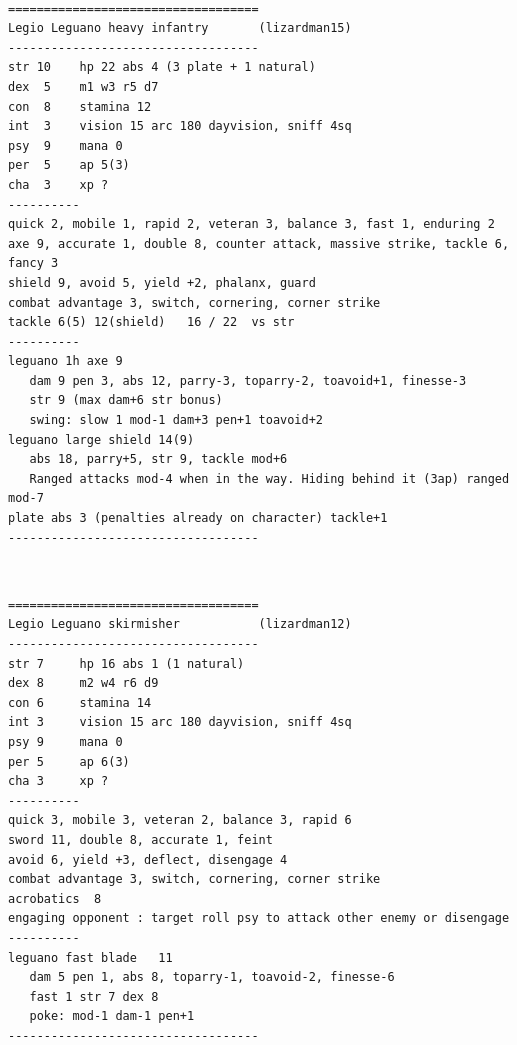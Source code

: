 \


\goodbreak
\begin{samepage}
\small \begin{verbatim}
===================================
Legio Leguano heavy infantry       (lizardman15)
-----------------------------------
str 10    hp 22 abs 4 (3 plate + 1 natural)
dex  5    m1 w3 r5 d7
con  8    stamina 12
int  3    vision 15 arc 180 dayvision, sniff 4sq
psy  9    mana 0
per  5    ap 5(3)
cha  3    xp ?
----------
quick 2, mobile 1, rapid 2, veteran 3, balance 3, fast 1, enduring 2
axe 9, accurate 1, double 8, counter attack, massive strike, tackle 6, fancy 3
shield 9, avoid 5, yield +2, phalanx, guard
combat advantage 3, switch, cornering, corner strike
tackle 6(5) 12(shield)   16 / 22  vs str
----------
leguano 1h axe 9
   dam 9 pen 3, abs 12, parry-3, toparry-2, toavoid+1, finesse-3
   str 9 (max dam+6 str bonus)
   swing: slow 1 mod-1 dam+3 pen+1 toavoid+2
leguano large shield 14(9)
   abs 18, parry+5, str 9, tackle mod+6
   Ranged attacks mod-4 when in the way. Hiding behind it (3ap) ranged mod-7
plate abs 3 (penalties already on character) tackle+1
-----------------------------------
\end{verbatim} \normalsize
\end{samepage}

\


\goodbreak
\begin{samepage}
\small \begin{verbatim}
===================================
Legio Leguano skirmisher           (lizardman12)
-----------------------------------
str 7     hp 16 abs 1 (1 natural)
dex 8     m2 w4 r6 d9
con 6     stamina 14
int 3     vision 15 arc 180 dayvision, sniff 4sq
psy 9     mana 0
per 5     ap 6(3)
cha 3     xp ?
----------
quick 3, mobile 3, veteran 2, balance 3, rapid 6
sword 11, double 8, accurate 1, feint
avoid 6, yield +3, deflect, disengage 4
combat advantage 3, switch, cornering, corner strike
acrobatics  8
engaging opponent : target roll psy to attack other enemy or disengage
----------
leguano fast blade   11
   dam 5 pen 1, abs 8, toparry-1, toavoid-2, finesse-6
   fast 1 str 7 dex 8
   poke: mod-1 dam-1 pen+1
-----------------------------------
\end{verbatim} \normalsize
\end{samepage}

\


